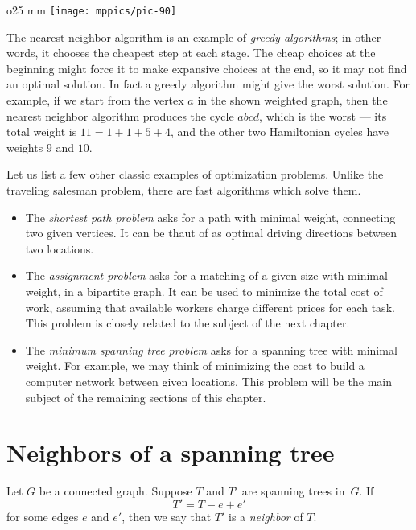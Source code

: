 \begin{wrapfigure}{o}{25 mm}
\vskip-0mm
\centering
\texttt{[image: mppics/pic-90]}
\end{wrapfigure}

The nearest neighbor algorithm is an example of \emph{greedy algorithms};
in other words, it chooses the cheapest step at each stage.
The cheap choices at the beginning might force it to make expansive choices at the end,
so it may not find an optimal solution. 
In fact a greedy algorithm might give the worst solution.
For example, if we start from the vertex $a$ in the shown weighted graph, then the nearest neighbor algorithm produces the cycle $abcd$, which is the worst --- its total weight is $11=1+1+5+4$, and the other two  Hamiltonian cycles have weights $9$ and $10$.


{\sloppy

Let us list a few other classic examples of optimization problems.
Unlike the traveling salesman problem, there are fast algorithms which solve them.
\begin{itemize}
\item The \emph{shortest path problem} asks for a path with minimal weight, connecting two given vertices.
It can be thaut of as optimal driving directions between two locations.
\item The \label{assignment problem}\emph{assignment problem} asks for a matching of a given size with minimal weight, in a bipartite graph.
It can be used to minimize the total cost of work, assuming that available workers charge different prices for each task.
This problem is closely related to the subject of the next chapter.
\item The \emph{minimum spanning tree problem} asks for a spanning tree with minimal weight.
For example, we may think of minimizing the cost to build a computer network between given locations.
This problem will be the main subject of the remaining sections of this chapter.
\end{itemize}

}

\section{Neighbors of a spanning tree}

Let $G$ be a connected graph.
Suppose $T$ and $T'$ are spanning trees in~$G$.
If 
\[T'=T-e+e'\]
for some edges $e$ and $e'$,
then we say that $T'$ is a \emph{neighbor} of $T$.

